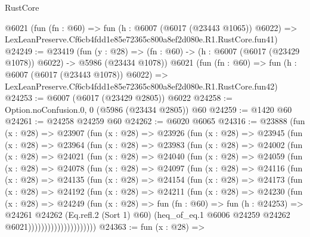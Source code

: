 \begin{lexlean}{RustCore}
\begin{coremodule}
    @6021
    (fun (fn : @60) =>
    fun (h : @6007 (@6017 (@23443 @1065)) @6022) =>
    LexLeanPreserve.Cf6cb4fdd1e85e72365c800a8ef2d080e.R1.RustCore.fun41)
@24249 := @23419
    (fun (y : @28) =>
    (fn : @60) -> (h : @6007 (@6017 (@23429 @1078)) @6022) -> @5986 (@23434 @1078))
    @6021
    (fun (fn : @60) =>
    fun (h : @6007 (@6017 (@23443 @1078)) @6022) =>
    LexLeanPreserve.Cf6cb4fdd1e85e72365c800a8ef2d080e.R1.RustCore.fun42)
@24253 := @6007 (@6017 (@23429 @2805)) @6022
@24258 := Option.noConfusion.{0, 0} (@5986 (@23434 @2805)) @60
@24259 := @1420 @60
@24261 := @24258 @24259 @60
@24262 := @6020 @6065
@24316 := @23888
    (fun (x : @28) =>
    @23907
      (fun (x : @28) =>
      @23926
        (fun (x : @28) =>
        @23945
          (fun (x : @28) =>
          @23964
            (fun (x : @28) =>
            @23983
              (fun (x : @28) =>
              @24002
                (fun (x : @28) =>
                @24021
                  (fun (x : @28) =>
                  @24040
                    (fun (x : @28) =>
                    @24059
                      (fun (x : @28) =>
                      @24078
                        (fun (x : @28) =>
                        @24097
                          (fun (x : @28) =>
                          @24116
                            (fun (x : @28) =>
                            @24135
                              (fun (x : @28) =>
                              @24154
                                (fun (x : @28) =>
                                @24173
                                  (fun (x : @28) =>
                                  @24192
                                    (fun (x : @28) =>
                                    @24211
                                      (fun (x : @28) =>
                                      @24230
                                        (fun (x : @28) =>
                                        @24249
                                          (fun (x : @28) =>
                                          fun (fn : @60) =>
                                          fun (h : @24253) =>
                                          @24261
                                            @24262
                                            (Eq.refl.{2} (Sort 1) @60)
                                            (heq_of_eq.{1}
                                              @6006
                                              @24259
                                              @24262
                                              @6021)))))))))))))))))))))
@24363 := fun (x : @28) =>

\end{coremodule}
\end{lexlean}

